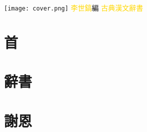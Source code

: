 \documentclass[a5paper,12pt]{report}
\begin{document}
\begin{titlepage}
\hfill
\vfill
\hspace{-40mm}
\texttt{[image: cover.png]}
\vfill
{\fontsize{14pt}{14pt}\selectfont\textcolor{gold}{李世鎬}\hspace{24pt}編}
\vspace{24pt}\newline
{\fontsize{36pt}{36pt}\selectfont\textcolor{gold}{\hspace{48pt}古典漢文辭書}}
\vfill
\end{titlepage}
\newpage
\chapter*{首}
\onehalfspacing


\chapter*{辭書}
\begin{multicols}{3}
\onehalfspacing

\end{multicols}

\chapter*{謝恩}
\onehalfspacing

\end{document}
